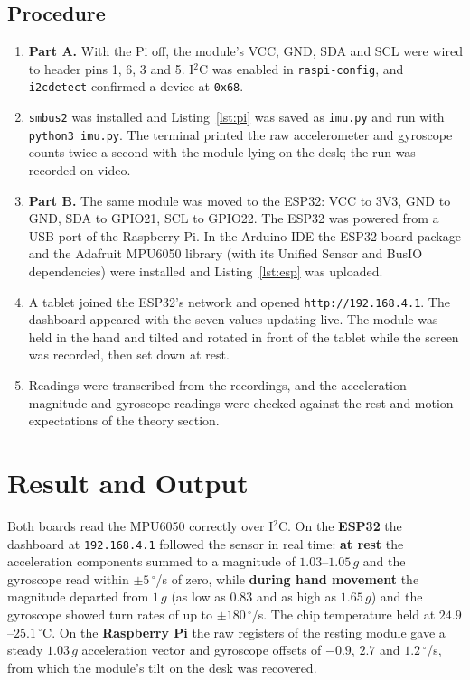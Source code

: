 \documentclass[10pt,a4paper]{article}
\begin{document}
\subsection{Procedure}
\begin{enumerate}
  \item \textbf{Part A.} With the Pi off, the module's VCC, GND, SDA and SCL were wired
        to header pins 1, 6, 3 and 5. I$^2$C was enabled in \texttt{raspi-config}, and
        \texttt{i2cdetect} confirmed a device at \texttt{0x68}.
  \item \texttt{smbus2} was installed and Listing~\ref{lst:pi} was saved as
        \texttt{imu.py} and run with \texttt{python3 imu.py}. The terminal printed the
        raw accelerometer and gyroscope counts twice a second with the module lying on
        the desk; the run was recorded on video.
  \item \textbf{Part B.} The same module was moved to the ESP32: VCC to 3V3, GND to GND,
        SDA to GPIO21, SCL to GPIO22. The ESP32 was powered from a USB port of the
        Raspberry Pi. In the Arduino IDE the ESP32 board package and the Adafruit
        MPU6050 library (with its Unified Sensor and BusIO dependencies) were installed
        and Listing~\ref{lst:esp} was uploaded.
  \item A tablet joined the ESP32's network and opened \texttt{http://192.168.4.1}. The
        dashboard appeared with the seven values updating live. The module was held in
        the hand and tilted and rotated in front of the tablet while the screen was
        recorded, then set down at rest.
  \item Readings were transcribed from the recordings, and the acceleration magnitude
        and gyroscope readings were checked against the rest and motion expectations of
        the theory section.
\end{enumerate}

\section{Result and Output}

\begin{keybox}
Both boards read the MPU6050 correctly over I$^2$C. On the \textbf{ESP32} the
dashboard at \texttt{192.168.4.1} followed the sensor in real time: \textbf{at rest}
the acceleration components summed to a magnitude of $1.03$--$1.05\,g$ and the
gyroscope read within $\pm5\,^{\circ}$/s of zero, while \textbf{during hand movement}
the magnitude departed from $1\,g$ (as low as $0.83$ and as high as $1.65\,g$) and the
gyroscope showed turn rates of up to $\pm180\,^{\circ}$/s. The chip temperature held
at $24.9$--$25.1\,^{\circ}\mathrm{C}$. On the \textbf{Raspberry Pi} the raw registers
of the resting module gave a steady $1.03\,g$ acceleration vector and gyroscope
offsets of $-0.9$, $2.7$ and $1.2\,^{\circ}$/s, from which the module's tilt on the
desk was recovered.
\end{keybox}
\end{document}
